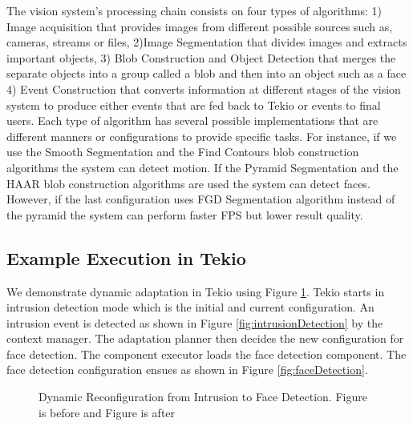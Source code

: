 \documentclass{acm_proc_article-sp}
\begin{document}
The vision system's processing chain consists on four types of algorithms: 1) Image acquisition that provides images from different possible sources such as, cameras, streams or files, 2)Image Segmentation that divides images and extracts important objects, 3) Blob Construction and Object Detection that merges the separate objects  into a group called a blob and then into an object such as a face 4) Event  Construction that converts information at different stages of the vision system to produce either events that are fed back to Tekio or events to final users. Each type of algorithm has several possible implementations that are  different manners or configurations to provide specific tasks. For instance, if we use the Smooth Segmentation and the Find Contours blob construction algorithms the system can detect motion. If the Pyramid Segmentation and the HAAR blob construction algorithms are used the system can detect faces. However, if the last configuration uses FGD Segmentation algorithm instead of the pyramid the system can perform faster FPS but lower result quality.

\subsection{Example Execution in Tekio}

We demonstrate dynamic adaptation in Tekio using  Figure
\ref{fig:exampleExecution}. Tekio starts in intrusion detection mode
which is the initial and current configuration. An intrusion event is
detected as shown in Figure \ref{fig:intrusionDetection} by the context manager. The adaptation planner then decides the new
  configuration for face detection. The component executor loads the face detection component. The face detection configuration ensues as
  shown in Figure  \ref{fig:faceDetection}.


\begin{figure}
\centering
{}
	\label{fig:exampleExecution}
	\caption[Dynamic Reconfiguration from Intrusion to Face Detection]{Dynamic Reconfiguration from Intrusion to Face Detection. Figure  is before and Figure  is after}
\end{figure}
\end{document}
